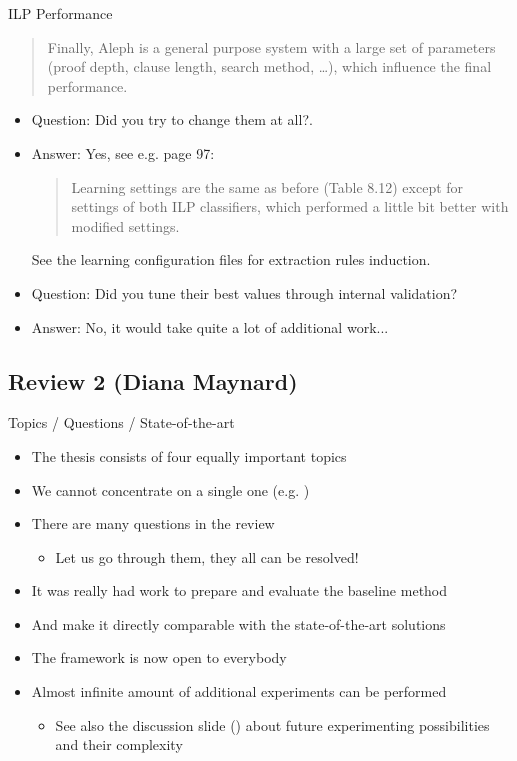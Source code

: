 \documentclass[xcolor=dvipsnames]{beamer}
\begin{document}
\begin{frame}{ILP Performance}
\begin{quotation}
Finally, Aleph is a general purpose system with a
large set of parameters (proof depth, clause length, search method, \dots), which influence the
final performance.
\end{quotation}
\begin{itemize}
	\item Question: Did you try to change them at all?.
	\item Answer: Yes, see e.g. page 97: 
	\begin{quotation}Learning settings are the same as before (Table 8.12) except for settings of both ILP classifiers, which performed a little bit better with modified settings.\end{quotation}
	See the learning configuration files for extraction rules induction.
	\bigskip
	\item Question: Did you tune their best values through internal validation?
	\item Answer: No, it would take quite a lot of additional work...
\end{itemize}
\end{frame}
\resetcolor


\resetcolor

\subsection{Review 2 (Diana Maynard)} 

\begin{frame}{Topics / Questions / State-of-the-art}
\begin{itemize}
	\item The thesis consists of \alert{four equally important topics}
	\item We cannot concentrate on a single one (e.g. )
	\bigskip
	\item There are many questions in the review
	\begin{itemize}
		\item Let us go through them, \alert{they all can be resolved!}
	\end{itemize}
	\bigskip
	\item It was really had work to prepare and evaluate the baseline method
	\item And make it \alert{directly comparable} with the state-of-the-art solutions
	\item The framework is now open to everybody
	\item Almost infinite amount of additional experiments can be performed
	\begin{itemize}
		\item See also the discussion slide (\pageref{future_experiments}) about future experimenting possibilities and their \alert{complexity}
	\end{itemize}
\end{itemize}
\end{frame}
\end{document}
